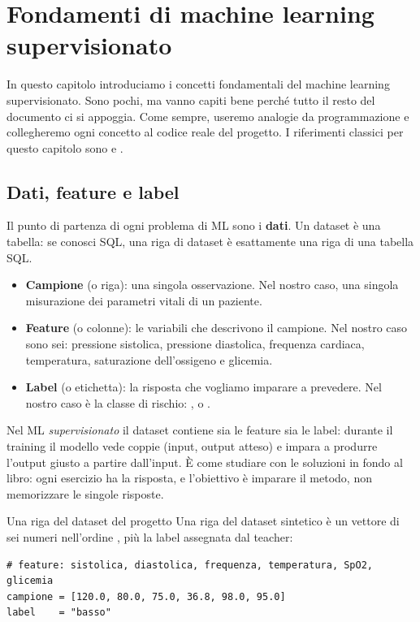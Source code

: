 \chapter{Fondamenti di machine learning supervisionato}\label{cap:fondamenti}


In questo capitolo introduciamo i concetti fondamentali del machine learning
supervisionato. Sono pochi, ma vanno capiti bene perché tutto il resto del
documento ci si appoggia. Come sempre, useremo analogie da programmazione e
collegheremo ogni concetto al codice reale del progetto. I riferimenti
classici per questo capitolo sono \cite{goodfellow2016deep} e
\cite{bishop2006pattern}.

\section{Dati, feature e label}\label{sec:dati-feature-label}

Il punto di partenza di ogni problema di ML sono i \textbf{dati}. Un dataset
è una tabella: se conosci SQL, una riga di dataset è esattamente una riga di
una tabella SQL.

\begin{itemize}
  \item \textbf{Campione} (o riga): una singola osservazione. Nel nostro
        caso, una singola misurazione dei parametri vitali di un paziente.
  \item \textbf{Feature} (o colonne): le variabili che descrivono il
        campione. Nel nostro caso sono sei: pressione sistolica, pressione
        diastolica, frequenza cardiaca, temperatura, saturazione
        dell'ossigeno e glicemia.
  \item \textbf{Label} (o etichetta): la risposta che vogliamo imparare a
        prevedere. Nel nostro caso è la classe di rischio:
        ,  o .
\end{itemize}

Nel ML \emph{supervisionato} il dataset contiene sia le feature sia le label:
durante il training il modello vede coppie (input, output atteso) e impara a
produrre l'output giusto a partire dall'input. È come studiare con le
soluzioni in fondo al libro: ogni esercizio ha la risposta, e l'obiettivo è
imparare il metodo, non memorizzare le singole risposte.

\begin{esempio}{Una riga del dataset del progetto}
Una riga del dataset sintetico è un vettore di sei numeri nell'ordine
, più la label assegnata dal teacher:

\begin{lstlisting}[caption={Esempio di campione etichettato (valori illustrativi)}]
# feature: sistolica, diastolica, frequenza, temperatura, SpO2, glicemia
campione = [120.0, 80.0, 75.0, 36.8, 98.0, 95.0]
label    = "basso"
\end{lstlisting}
\end{esempio}

